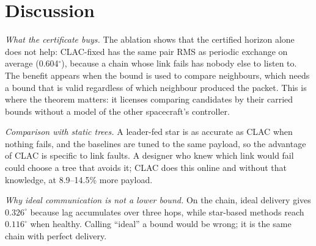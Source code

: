 \documentclass[journal]{IEEEtran}
\begin{document}
\section{Discussion}
\emph{What the certificate buys.} The ablation shows that the certified horizon alone does not help: CLAC-fixed has the same pair RMS as periodic exchange on average (0.604$^\circ$), because a chain whose link fails has nobody else to listen to. The benefit appears when the bound is used to compare neighbours, which needs a bound that is valid regardless of which neighbour produced the packet. This is where the theorem matters: it licenses comparing candidates by their carried bounds without a model of the other spacecraft's controller.

\emph{Comparison with static trees.} A leader-fed star is as accurate as CLAC when nothing fails, and the baselines are tuned to the same payload, so the advantage of CLAC is specific to link faults. A designer who knew which link would fail could choose a tree that avoids it; CLAC does this online and without that knowledge, at 8.9--14.5\% more payload.

\emph{Why ideal communication is not a lower bound.} On the chain, ideal delivery gives $0.326^\circ$ because lag accumulates over three hops, while star-based methods reach $0.116^\circ$ when healthy. Calling ``ideal'' a bound would be wrong; it is the same chain with perfect delivery.
\end{document}
